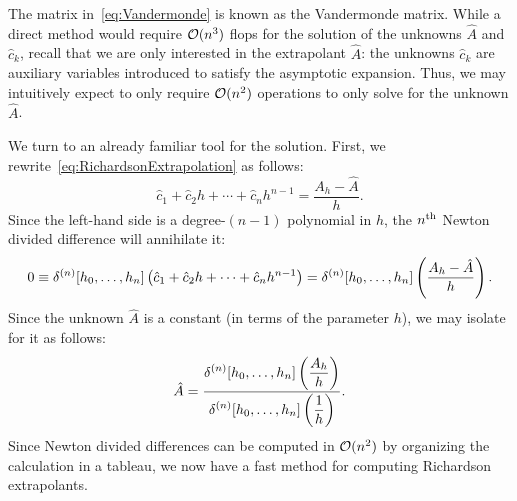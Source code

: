 The matrix in~\eqref{eq:Vandermonde} is known as the Vandermonde matrix. While a direct method would require $\mathcal{O}(n^3)$ flops for the solution of the unknowns $\hat{A}$ and $\hat{c}_k$, recall that we are only interested in the extrapolant $\hat{A}$: the unknowns $\hat{c}_k$ are auxiliary variables introduced to satisfy the asymptotic expansion. Thus, we may intuitively expect to only require $\mathcal{O}(n^2)$ operations to only solve for the unknown $\hat{A}$.

We turn to an already familiar tool for the solution. First, we rewrite~\eqref{eq:RichardsonExtrapolation} as follows:
\[
\hat{c}_1 + \hat{c}_2h + \cdots + \hat{c}_nh^{n-1} = \dfrac{A_h-\hat{A}}{h}.
\]
Since the left-hand side is a degree-$(n-1)$ polynomial in $h$, the $n^{\rm th}$ Newton divided difference will annihilate it:
\[
0 \equiv \delta^{(n)}[h_0,\ldots,h_n]\pr(\hat{c}_1 + \hat{c}_2h + \cdots + \hat{c}_nh^{n-1}) = \delta^{(n)}[h_0,\ldots,h_n]\pr(\dfrac{A_h-\hat{A}}{h}).
\]
Since the unknown $\hat{A}$ is a constant (in terms of the parameter $h$), we may isolate for it as follows:
\[
\hat{A} = \dfrac{\displaystyle\delta^{(n)}[h_0,\ldots,h_n]\pr(\frac{A_h}{h})}{\displaystyle\delta^{(n)}[h_0,\ldots,h_n]\pr(\frac{1}{h})}.
\]
Since Newton divided differences can be computed in $\mathcal{O}(n^2)$ by organizing the calculation in a tableau, we now have a fast method for computing Richardson extrapolants.

